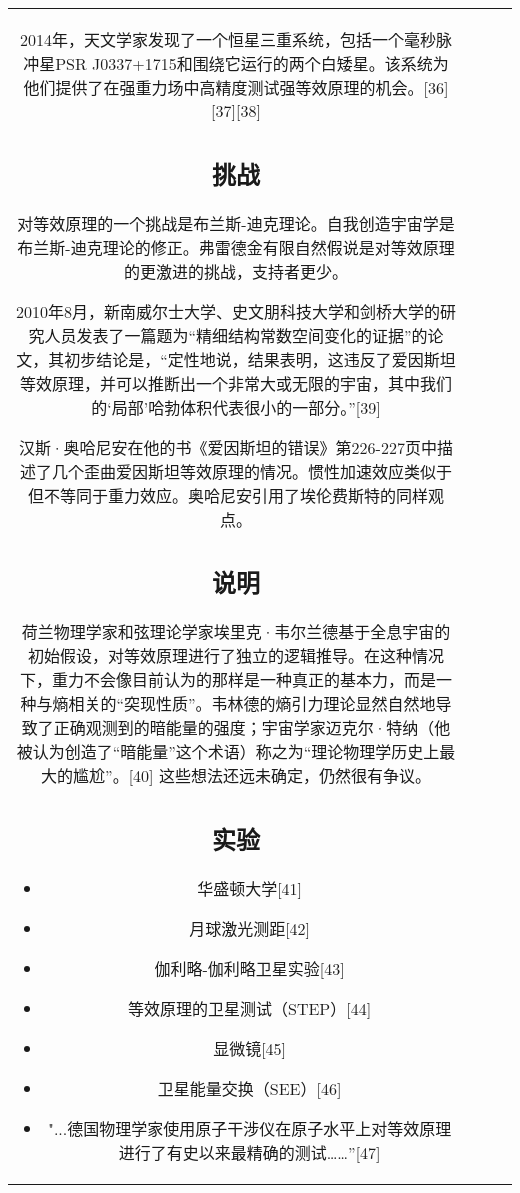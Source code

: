 \begin{table}[ht]
\begin{tabular}{|c|c|c|c}
2014年，天文学家发现了一个恒星三重系统，包括一个毫秒脉冲星PSR J0337+1715和围绕它运行的两个白矮星。该系统为他们提供了在强重力场中高精度测试强等效原理的机会。[36][37][38]

\subsection{挑战}

对等效原理的一个挑战是布兰斯-迪克理论。自我创造宇宙学是布兰斯-迪克理论的修正。弗雷德金有限自然假说是对等效原理的更激进的挑战，支持者更少。

2010年8月，新南威尔士大学、史文朋科技大学和剑桥大学的研究人员发表了一篇题为“精细结构常数空间变化的证据”的论文，其初步结论是，“定性地说，结果表明，这违反了爱因斯坦等效原理，并可以推断出一个非常大或无限的宇宙，其中我们的‘局部’哈勃体积代表很小的一部分。”[39]

汉斯·奥哈尼安在他的书《爱因斯坦的错误》第226-227页中描述了几个歪曲爱因斯坦等效原理的情况。惯性加速效应类似于但不等同于重力效应。奥哈尼安引用了埃伦费斯特的同样观点。

\subsection{说明}

荷兰物理学家和弦理论学家埃里克·韦尔兰德基于全息宇宙的初始假设，对等效原理进行了独立的逻辑推导。在这种情况下，重力不会像目前认为的那样是一种真正的基本力，而是一种与熵相关的“突现性质”。韦林德的熵引力理论显然自然地导致了正确观测到的暗能量的强度；宇宙学家迈克尔·特纳（他被认为创造了“暗能量”这个术语）称之为“理论物理学历史上最大的尴尬”。[40] 这些想法还远未确定，仍然很有争议。

\subsection{实验}

\begin{itemize}
\item 华盛顿大学[41]
\item 月球激光测距[42]
\item 伽利略-伽利略卫星实验[43]
\item 等效原理的卫星测试（STEP）[44]
\item 显微镜[45]
\item 卫星能量交换（SEE）[46]
\item "...德国物理学家使用原子干涉仪在原子水平上对等效原理进行了有史以来最精确的测试……”[47]
\end{itemize}



\end{tabular}
\end{table}
